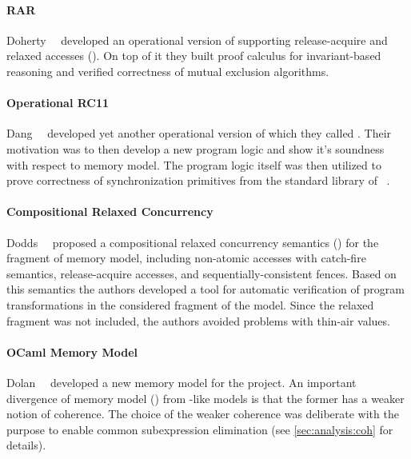 \paragraph{RAR}

Doherty~\etal~\cite{Doherty-al:PPoPP19} developed an 
operational version of \RCMM supporting 
release-acquire and relaxed accesses (\RAR). 
On top of it they built proof calculus for 
invariant-based reasoning and verified 
correctness of mutual exclusion algorithms. 

\paragraph{Operational RC11}

Dang~\etal~\cite{Dang-al:POPL19} developed yet another 
operational version of \RCMM which they called \ORCMM. 
Their motivation was to then develop a 
new program logic and show it's soundness
with respect to \ORCMM memory model. 
The program logic itself was then utilized to 
prove correctness of synchronization primitives 
from the standard library of \Rust~\cite{RustBook:19}.

\paragraph{Compositional Relaxed Concurrency}

Dodds~\etal~\cite{Dodds-al:ESOP18} proposed a  
compositional relaxed concurrency semantics (\CRC) 
for the fragment of \CMM memory model, 
including non-atomic accesses with catch-fire semantics, 
release-acquire accesses, and sequentially-consistent fences. 
Based on this semantics the authors developed 
a tool for automatic verification of program transformations
in the considered fragment of the \CMM model. 
Since the relaxed fragment was not included, 
the authors avoided problems with thin-air values. 

\paragraph{OCaml Memory Model}

Dolan~\etal~\cite{Dolan-al:PLDI18} developed a new 
memory model for the \MOCaml project. 
An important divergence of \OCaml memory model (\OCMM)
from \CMM-like models is that the former 
has a weaker notion of coherence.
The choice of the weaker coherence was deliberate 
with the purpose to enable common subexpression elimination
(see \cref{sec:analysis:coh} for details).

